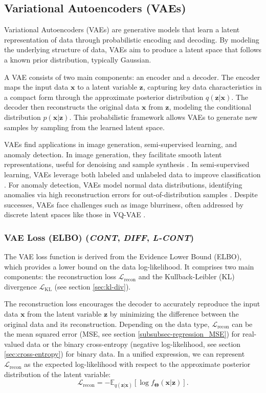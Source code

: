 \documentclass[sn-mathphys-num]{sn-jnl}%
\newcommand \cont{\textit{CONT}}
\newcommand \lcont{\textit{L-CONT}}
\newcommand \diff{\textit{DIFF}}
\renewcommand\vec{\mathbf}
\begin{document}
\subsection{Variational Autoencoders (VAEs)}\label{sec:vae}
Variational Autoencoders (VAEs) \cite{kingma2013auto,rezende2014stochastic} are generative models that learn a latent representation of data through probabilistic encoding and decoding. By modeling the underlying structure of data, VAEs aim to produce a latent space that follows a known prior distribution, typically Gaussian.

A VAE consists of two main components: an encoder and a decoder. The encoder maps the input data $\mathbf{x}$ to a latent variable $\mathbf{z}$, capturing key data characteristics in a compact form through the approximate posterior distribution $q(\mathbf{z}|\mathbf{x})$. The decoder then reconstructs the original data $\mathbf{x}$ from $\mathbf{z}$, modeling the conditional distribution $p(\mathbf{x}|\mathbf{z})$. This probabilistic framework allows VAEs to generate new samples by sampling from the learned latent space.

VAEs find applications in image generation, semi-supervised learning, and anomaly detection. In image generation, they facilitate smooth latent representations, useful for denoising and sample synthesis \cite{hou2017deep,bengio2013representation}. In semi-supervised learning, VAEs leverage both labeled and unlabeled data to improve classification \cite{kingma2014semi}. For anomaly detection, VAEs model normal data distributions, identifying anomalies via high reconstruction errors for out-of-distribution samples \cite{an2015variational}. Despite successes, VAEs face challenges such as image blurriness, often addressed by discrete latent spaces like those in VQ-VAE \cite{van2017neural}.

\subsubsection{VAE Loss (ELBO) (\cont, \diff, \lcont)}\label{subsubsec-generative_vae_loss}
The VAE loss function is derived from the Evidence Lower Bound (ELBO), which provides a lower bound on the data log-likelihood. It comprises two main components: the reconstruction loss $\mathcal{L}_{\text{recon}}$ and the Kullback-Leibler (KL) divergence $\mathcal{L}_{\text{KL}}$ (see section \ref{sec:kl-div}).

The reconstruction loss encourages the decoder to accurately reproduce the input data $\mathbf{x}$ from the latent variable $\mathbf{z}$ by minimizing the difference between the original data and its reconstruction. Depending on the data type, $\mathcal{L}_{\text{recon}}$ can be the mean squared error (MSE, see section \ref{subsubsec-regression_MSE}) for real-valued data or the binary cross-entropy (negative log-likelihood, see section \ref{sec:cross-entropy}) for binary data. In a unified expression, we can represent $\mathcal{L}_{\text{recon}}$ as the expected log-likelihood with respect to the approximate posterior distribution of the latent variable:
\[
\mathcal{L}_{\text{recon}} = - \mathbb{E}_{q(\mathbf{z}|\mathbf{x})}[\log f_{\vec{\Theta}}(\mathbf{x}|\mathbf{z})].
\]
\end{document}
